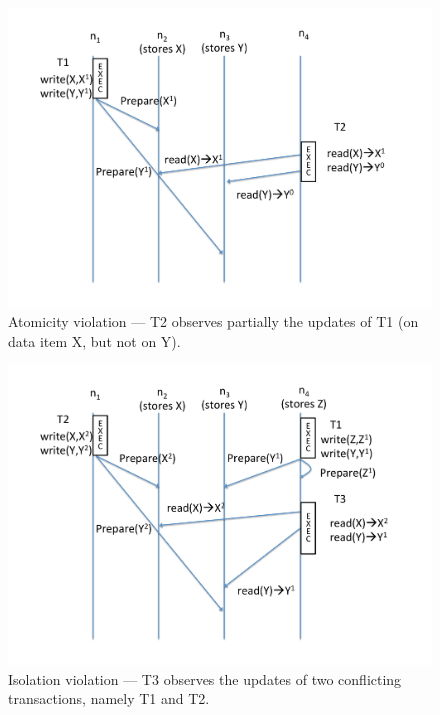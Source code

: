 \begin{figure}[t!]
\centering
\hspace{-5mm}
\includegraphics[scale = 0.24]{figures/example1.pdf}
\vspace{-5mm}
\caption{\footnotesize Atomicity violation --- T2 observes partially the updates of T1 (on data item X, but not on Y).}
\label{fig:ex1}
\vspace{-5mm}
\end{figure}

\begin{figure}[t!]
\centering
\hspace{-5mm}
\includegraphics[scale = 0.24]{figures/example2.pdf}
\vspace{-5mm}
\caption{\footnotesize Isolation violation --- T3 observes the updates of two conflicting transactions, namely T1 and T2.}
\label{fig:ex2}
\vspace{-5mm}
\end{figure}

